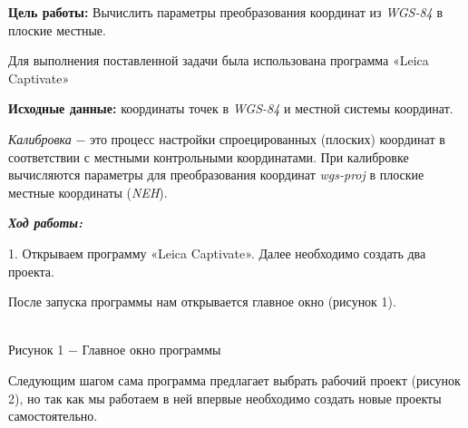 \documentclass[a4paper]{article}
\begin{document}
\large{\textbf{Цель работы:} Вычислить параметры преобразования координат из \textit{WGS-84} в плоские местные.
\par Для выполнения поставленной задачи была использована программа «Leica Captivate»
\par \textbf{Исходные данные:} координаты точек в \textit{WGS-84} и местной системы координат. 
\par \textit{Калибровка} $-$ это процесс настройки спроецированных (плоских)
координат в соответствии с местными контрольными координатами. При
калибровке вычисляются параметры для преобразования координат \textit{wgs-proj} в
плоские местные координаты (\textit{NEH}). 
\begin{center}
    \textbf{\textit{Ход работы:}}
\end{center}
\par 1. Открываем программу «Leica Captivate». Далее необходимо создать два проекта.
\par После запуска программы нам открывается главное окно (рисунок 1).
\begin{center}
   \\
    Рисунок 1 $-$ Главное окно программы
\end{center}
\par Следующим шагом сама программа предлагает выбрать рабочий проект (рисунок 2), но так как мы работаем в ней впервые необходимо создать новые проекты самостоятельно.
\begin{center}
     \\

\end{center}}
\end{document}
